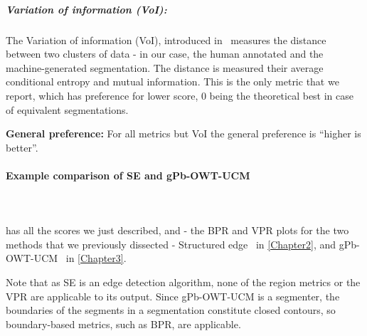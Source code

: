 \subparagraph{Variation of information (VoI):} The Variation of information (VoI), introduced in~\cite{Meila05} measures the distance between two clusters of data - in our case, the human annotated and the machine-generated segmentation. The distance is measured \wrt %
their average conditional entropy and mutual information. This is the only metric that we report, which has preference for lower score, 0 being the theoretical best in case of equivalent segmentations.

\textbf{General preference:} For all metrics but VoI the general preference is ``higher is better''.

\paragraph{Example comparison of SE and gPb-OWT-UCM}\mbox{}\\\mbox{}\\
 has all the scores we just described, and  - the BPR and VPR plots for the two methods that we previously dissected - Structured edge~\cite{DollarICCV13edges} in \cref{Chapter2}, and gPb-OWT-UCM~\cite{Arbelaez11} in \cref{Chapter3}. 

Note that as SE is an edge detection algorithm, none of the region metrics or the VPR are applicable to its output. Since gPb-OWT-UCM is a segmenter, the boundaries of the segments in a segmentation constitute closed contours, so boundary-based metrics, such as BPR, are applicable.


